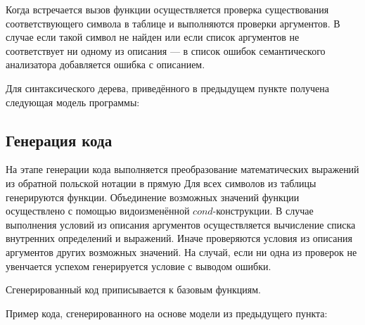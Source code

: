     Когда встречается вызов функции осуществляется проверка существования соответствующего символа в таблице и выполняются проверки аргументов.
    В случае если такой символ не найден или если список аргументов не соответствует ни одному из описания --- в список ошибок семантического анализатора добавляется ошибка с описанием.

    Для синтаксического дерева, приведённого в предыдущем пункте получена следующая модель программы:
    
    
    
    \subsection{Генерация кода}
    На этапе генерации кода выполняется преобразование математических выражений из обратной польской нотации в прямую
    Для всех символов из таблицы генерируются функции.
    Объединение возможных значений функции осуществлено с помощью видоизменённой $cond$-конструкции.
    В случае выполнения условий из описания аргументов осуществляется вычисление списка внутренних определений и выражений.
    Иначе проверяются условия из описания аргументов других возможных значений.
    На случай, если ни одна из проверок не увенчается успехом генерируется условие с выводом ошибки.

    Сгенерированный код приписывается к базовым функциям.

    Пример кода, сгенерированного на основе модели из предыдущего пункта:

    
